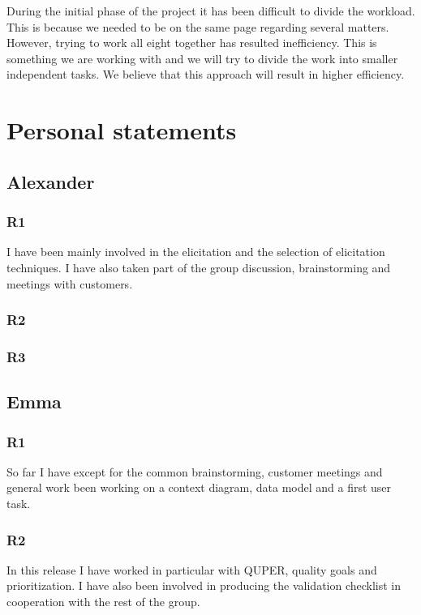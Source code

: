 \documentclass[a4paper]{article}
\begin{document}
During the initial phase of the project it has been difficult to divide the workload. This is because we needed to be on the same page regarding several matters. However, trying to work all eight together has resulted inefficiency. This is something we are working with and we will try to divide the work into smaller independent tasks. We believe that this approach will result in higher efficiency.


  \section{Personal statements}
  
  \subsection{Alexander}
    \subsubsection{R1}
    I have been mainly involved in the elicitation and the selection of elicitation techniques. I have also taken part of the group discussion, brainstorming and meetings with customers.
    \subsubsection{R2}
    \subsubsection{R3}
  
  \subsection{Emma}
    \subsubsection{R1}
    So far I have except for the common brainstorming, customer meetings and general work been working on a context diagram, data model and a first user task.
    \subsubsection{R2}
	In this release I have worked in particular with QUPER, quality goals and prioritization. I have also been involved in producing the validation checklist in cooperation with the rest of the group.
\end{document}
